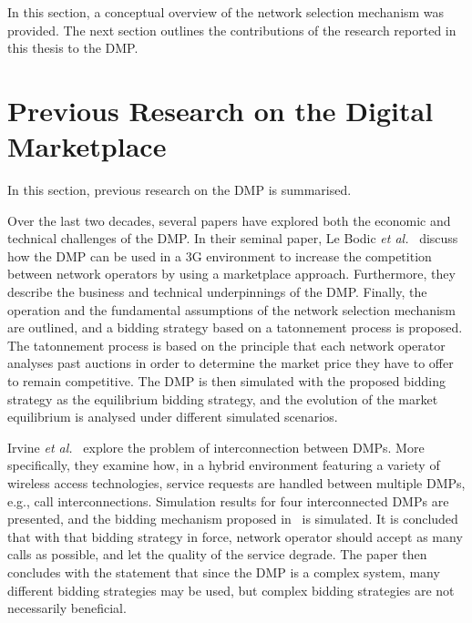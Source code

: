 In this section, a conceptual overview of the network selection mechanism was provided. The next section outlines the contributions of the research reported in this thesis to the DMP.

\section{Previous Research on the Digital Marketplace} %
\label{sec:previous_research_on_the_digital_marketplace_dmp}
In this section, previous research on the DMP is summarised.

Over the last two decades, several papers have explored both the economic and technical challenges of the DMP. In their seminal paper, Le Bodic \emph{et al.}~\cite{DMLeBodic00} discuss how the DMP can be used in a 3G environment to increase the competition between network operators by using a marketplace approach. Furthermore, they describe the business and technical underpinnings of the DMP. Finally, the operation and the fundamental assumptions of the network selection mechanism are outlined, and a bidding strategy based on a tatonnement process is proposed. The tatonnement process is based on the principle that each network operator analyses past auctions in order to determine the market price they have to offer to remain competitive. The DMP is then simulated with the proposed bidding strategy as the equilibrium bidding strategy, and the evolution of the market equilibrium is analysed under different simulated scenarios. 

Irvine \emph{et al.}~\cite{DMIrvine01} explore the problem of interconnection between DMPs. More specifically, they examine how, in a hybrid environment featuring a variety of wireless access technologies, service requests are handled between multiple DMPs, e.g., call interconnections. Simulation results for four interconnected DMPs are presented, and the bidding mechanism proposed in~\cite{DMLeBodic00} is simulated. It is concluded that with that bidding strategy in force, network operator should accept as many calls as possible, and let the quality of the service degrade. The paper then concludes with the statement that since the DMP is a complex system, many different bidding strategies may be used, but complex bidding strategies are not necessarily beneficial.

